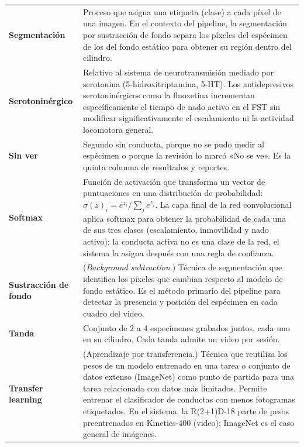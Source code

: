 \begin{longtable}{@{} p{4.0cm} p{10.9cm} @{}}
  \textbf{Segmentación}
  & Proceso que asigna una etiqueta (clase) a cada píxel de una imagen. En el
    contexto del pipeline, la segmentación por sustracción de fondo separa los
    píxeles del espécimen de los del fondo estático para obtener su región dentro
    del cilindro. \\[5pt]

  \textbf{Serotoninérgico}
  & Relativo al sistema de neurotransmisión mediado por serotonina (5-hidroxitriptamina, 5-HT). Los
    antidepresivos serotoninérgicos como la fluoxetina incrementan específicamente el tiempo
    de nado activo en el FST sin modificar significativamente el escalamiento ni
    la actividad locomotora general. \\[5pt]

  \textbf{Sin ver}
  & Segundo sin conducta, porque no se pudo medir al espécimen o porque la revisión lo marcó «No se ve». Es la quinta columna de resultados y reportes. \\[5pt]

  \textbf{Softmax}
  & Función de activación que transforma un vector de puntuaciones en una
    distribución de probabilidad: $\sigma(z)_i = e^{z_i}/\sum_j e^{z_j}$.
    La capa final de la red convolucional aplica softmax para obtener la
    probabilidad de cada una de sus tres clases (escalamiento, inmovilidad y nado
    activo); la conducta activa no es una clase de la red, el sistema la asigna después
    con una regla de confianza. \\[5pt]

  \textbf{Sustracción de fondo}
  & (\textit{Background subtraction}.) Técnica de segmentación que identifica
    los píxeles que cambian respecto al modelo de fondo estático. Es el método
    primario del pipeline para detectar la presencia y posición del espécimen
    en cada cuadro del video. \\[5pt]


  \textbf{Tanda}
  & Conjunto de 2 a 4 especímenes grabados juntos, cada uno en su cilindro. Cada tanda admite un video por sesión. \\[5pt]

  \textbf{Transfer learning}
  & (Aprendizaje por transferencia.) Técnica que reutiliza los pesos de un
    modelo entrenado en una tarea o conjunto de datos extenso (ImageNet) como
    punto de partida para una tarea relacionada con datos más limitados. Permite
    entrenar el clasificador de conductas con menos fotogramas etiquetados. En el sistema, la R(2+1)D-18 parte de pesos preentrenados en Kinetics-400 (video); ImageNet es el caso general de imágenes. \\[5pt]


\end{longtable}

